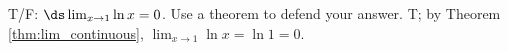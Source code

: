 {T/F: $\ds \lim_{x\to1}\ln x = 0$. Use a theorem to defend your answer.}
{T; by Theorem \ref{thm:lim_continuous}, $\lim_{x\to1}\ln x = \ln 1 =0$.}


